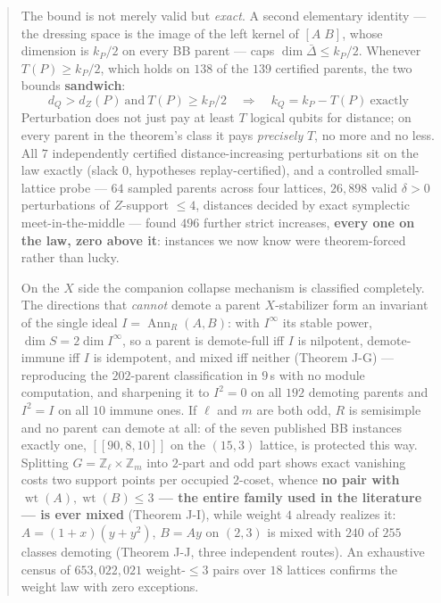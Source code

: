 \documentclass[11pt]{article}
\newcommand{\nk}[1]{[\![#1]\!]}
\theoremstyle{plain}
\theoremstyle{remark}
\begin{document}
\begin{abstract}
The bound is not merely valid but \emph{exact}.  A second elementary identity --- the
dressing space is the image of the left kernel of $[A\;B]$, whose dimension is
$k_P/2$ on every BB parent --- caps $\dim\bar\Delta\le k_P/2$.  Whenever
$T(P)\ge k_P/2$, which holds on $138$ of the $139$ certified parents, the two
bounds \textbf{sandwich}:
\[
\boxed{\;d_Q > d_Z(P)\ \text{and}\ T(P)\ge k_P/2\quad\Longrightarrow\quad
k_Q = k_P - T(P)\ \text{exactly}\;}
\]
Perturbation does not just pay at least $T$ logical qubits for distance; on
every parent in the theorem's class it pays \emph{precisely} $T$, no more and no
less.  All $7$ independently certified distance-increasing perturbations sit on
the law exactly (slack $0$, hypotheses replay-certified), and a controlled
small-lattice probe --- $64$ sampled parents across four lattices, $26{,}898$
valid $\delta>0$ perturbations of $Z$-support $\le 4$, distances decided by
exact symplectic meet-in-the-middle --- found $496$ further
strict increases, \textbf{every one on the law, zero above it}: instances we now
know were theorem-forced rather than lucky.

On the $X$ side the companion collapse mechanism is classified completely. The
directions that \emph{cannot} demote a parent $X$-stabilizer form an invariant of
the single ideal $I=\operatorname{Ann}_R(A,B)$: with $I^\infty$ its stable power,
$\dim S=2\dim I^\infty$, so a parent is demote-full iff $I$ is nilpotent,
demote-immune iff $I$ is idempotent, and mixed iff neither (Theorem J-G) ---
reproducing the $202$-parent classification in $9$\,s with no module
computation, and sharpening it to $I^2=0$ on all $192$ demoting parents and
$I^2=I$ on all $10$ immune ones. If $\ell$ and $m$ are both odd, $R$ is
semisimple and no parent can demote at all: of the seven published BB instances
exactly one, $\nk{90,8,10}$ on the $(15,3)$ lattice, is protected this way.
Splitting $G=\mathbb Z_\ell\times\mathbb Z_m$ into $2$-part and odd part shows
exact vanishing costs two support points per occupied $2$-coset, whence
\textbf{no pair with $\operatorname{wt}(A),\operatorname{wt}(B)\le3$ --- the
entire family used in the literature --- is ever mixed} (Theorem J-I), while
weight $4$ already realizes it: $A=(1+x)(y+y^2)$, $B=Ay$ on $(2,3)$ is mixed
with $240$ of $255$ classes demoting (Theorem J-J, three independent routes). An
exhaustive census of $653{,}022{,}021$ weight-$\le3$ pairs over $18$ lattices
confirms the weight law with zero exceptions.
\end{abstract}
\end{document}
